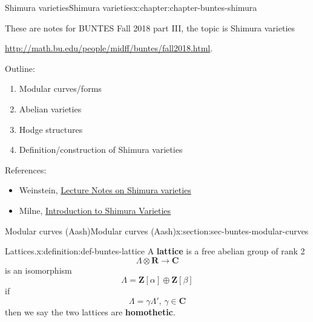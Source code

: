 \documentclass[oneside,10pt,]{book}
\newcommand{\terminology}[1]{\textbf{#1}}
\numberwithin{equation}{section}
\newcommand{\lb}{[}
\newcommand{\rb}{]}
\newcommand{\ZZ}{\mathbf{Z}}
\newcommand{\RR}{\mathbf{R}}
\newcommand{\CC}{\mathbf{C}}
\begin{document}
%
%
\typeout{************************************************}
\typeout{************************************************}
%
\begin{chapterptx}{Shimura varieties}{}{Shimura varieties}{}{}{x:chapter:chapter-buntes-shimura}
\begin{introduction}{}%
These are notes for BUNTES Fall 2018 part III, the topic is Shimura varieties%
\par
\url{http://math.bu.edu/people/midff/buntes/fall2018.html}.%
\par
Outline:%
\begin{enumerate}
\item{}Modular curves\slash{}forms%
\item{}Abelian varieties%
\item{}Hodge structures%
\item{}Definition\slash{}construction of Shimura varieties%
\end{enumerate}
%
\par
References:%
\begin{itemize}[label=\textbullet]
\item{}Weinstein, \href{http://math.bu.edu/people/jsweinst/Teaching/MA843Fall13/index.html}{Lecture Notes on Shimura varieties}%
\item{}Milne, \href{https://www.jmilne.org/math/xnotes/svi.pdf}{Introduction to Shimura Varieties}%
\end{itemize}
%
\end{introduction}%
%
%
\typeout{************************************************}
\typeout{************************************************}
%
\begin{sectionptx}{Modular curves (Aash)}{}{Modular curves (Aash)}{}{}{x:section:sec-buntes-modular-curves}
\begin{definition}{Lattices.}{x:definition:def-buntes-lattice}%
A \terminology{lattice} is a free abelian group of rank 2%
\begin{equation*}
\Lambda \otimes \RR \to \CC
\end{equation*}
is an isomorphism%
\begin{equation*}
\Lambda = \ZZ\lb \alpha \rb  \oplus \ZZ\lb \beta \rb
\end{equation*}
if%
\begin{equation*}
\Lambda = \gamma \Lambda ',\,\gamma \in \CC
\end{equation*}
then we say the two lattices are \terminology{homothetic}.%

\end{definition}
\end{sectionptx}
\end{chapterptx}
\end{document}
